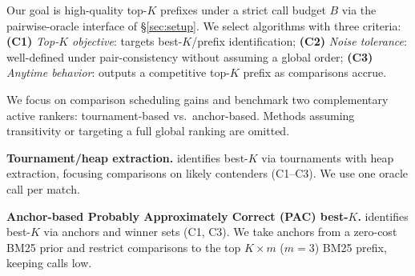 \documentclass[11pt]{article}
\begin{document}
Our goal is high-quality top-$K$ prefixes under a strict call budget $B$ via the pairwise-oracle interface of \S\ref{sec:setup}.
We select algorithms with three criteria:
\textbf{(C1)} \emph{Top-$K$ objective}: targets best-$K$/prefix identification;
\textbf{(C2)} \emph{Noise tolerance}: well-defined under pair-consistency without assuming a global order;
\textbf{(C3)} \emph{Anytime behavior}: outputs a competitive top-$K$ prefix as comparisons accrue.

We focus on comparison scheduling gains and benchmark two complementary active rankers: tournament-based vs.\ anchor-based. Methods assuming transitivity or targeting a full global ranking are omitted.

\noindent\textbf{Tournament/heap extraction.}
\citet{mohajer2017active} identifies best-$K$ via tournaments with heap extraction, focusing comparisons on likely contenders (C1--C3). We use one oracle call per match.

\noindent\textbf{Anchor-based Probably Approximately Correct (PAC) best-$K$.}
\citet{agarwal2022pac} identifies best-$K$ via anchors and winner sets (C1, C3).
We take anchors from a zero-cost BM25 prior and restrict comparisons to the top $K{\times}m$ ($m{=}3$) BM25 prefix, keeping calls low.
\end{document}
